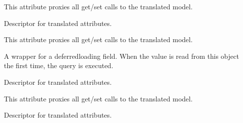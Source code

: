 \documentclass[letterpaper,10pt,french]{sphinxmanual}
\begin{document}
\begin{fulllineitems}
\begin{fulllineitems}
\sphinxAtStartPar
This attribute proxies all get/set calls to the translated model.

\end{fulllineitems}


\begin{fulllineitems}
\label{\detokenize{index:bookings.models.SeasonInfo.high_season_start}}
\pysigstartsignatures
\pysigline
{}
\pysigstopsignatures
\sphinxAtStartPar
Descriptor for translated attributes.

\sphinxAtStartPar
This attribute proxies all get/set calls to the translated model.

\end{fulllineitems}


\begin{fulllineitems}
\label{\detokenize{index:bookings.models.SeasonInfo.id}}
\pysigstartsignatures
\pysigline
{}
\pysigstopsignatures
\sphinxAtStartPar
A wrapper for a deferred\sphinxhyphen{}loading field. When the value is read from this
object the first time, the query is executed.

\end{fulllineitems}


\begin{fulllineitems}
\label{\detokenize{index:bookings.models.SeasonInfo.low_season_end}}
\pysigstartsignatures
\pysigline
{}
\pysigstopsignatures
\sphinxAtStartPar
Descriptor for translated attributes.

\sphinxAtStartPar
This attribute proxies all get/set calls to the translated model.

\end{fulllineitems}


\begin{fulllineitems}
\label{\detokenize{index:bookings.models.SeasonInfo.low_season_start}}
\pysigstartsignatures
\pysigline
{}
\pysigstopsignatures
\sphinxAtStartPar
Descriptor for translated attributes.


\end{fulllineitems}
\end{fulllineitems}
\end{document}
